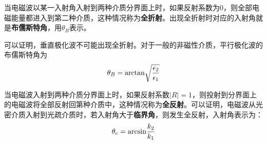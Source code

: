 \documentclass[UTF8,a4paper,11pt]{article}
\begin{document}
当电磁波以某一入射角入射到两种介质分界面上时，如果反射系数为0，则全部电磁能量都进入到第二种介质，这种情况称为\textbf{全折射}。出现全折射时对应的入射角就是\textbf{布儒斯特角}，用$\theta_B$表示。

可以证明，垂直极化波不可能出现全折射。对于一般的非磁性介质，平行极化波的布儒斯特角为
\begin{equation}
\theta_B={\rm arctan}\sqrt{\frac{\epsilon_2}{\epsilon_1}}
\end{equation}

当电磁波入射到两种介质分界面上时，如果反射系数$\lvert R\rvert=1$，则投射到分界面上的电磁波将全部反射回第种介质中，这种情况称为\textbf{全反射}。可以证明，电磁波从光密介质入射到光疏介质时，若入射角大于\textbf{临界角}，则发生全反射，入射角表示为：
\begin{equation}
\theta_c={\rm arcsin}\frac{k_2}{k_1}
\end{equation}
\end{document}
